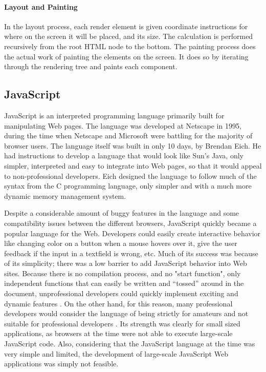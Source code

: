 \paragraph{Layout and Painting}
In the layout process, each render element is given coordinate instructions for where on the screen it will be placed, and its size. The calculation is performed recursively from the root HTML node to the bottom.
The painting process does the actual work of painting the elements on the screen. It does so by iterating through the rendering tree and paints each component.
 
\subsection{JavaScript}
JavaScript is an interpreted programming language primarily built for manipulating Web pages. The language was developed at Netscape in 1995, during the time when Netscape and Microsoft were battling for the majority of browser users. The language itself was built in only 10 days, by Brendan Eich\cite{jsin10days}. He had instructions to develop a language that would look like Sun's Java, only simpler, interpreted and easy to integrate into Web pages, so that it would appeal to non-professional developers. Eich designed the language to follow much of the syntax from the C programming language, only simpler and with a much more dynamic memory management system. 

Despite a considerable amount of buggy features in the language and some compatibility issues between the different browsers, JavaScript quickly became a  popular language for the Web. Developers could easily create interactive behavior like changing color on a button when a mouse hovers over it, give the user feedback if the input in a textfield is wrong, etc. Much of its success was because of its simplicity; there was a low barrier to add JavaScript behavior into Web sites. Because there is no compilation process, and no "start function", only independent functions that can easily be written and ``tossed'' around in the document, unprofessional developers could quickly implement exciting and dynamic features \cite{jsHowGotHere}. On the other hand, for this reason, many professional developers would consider the language of being strictly for amateurs and not suitable for professional developers \cite{UnderstoodJs}.  Its strength was clearly for small sized applications, as browsers at the time were not able to execute large-scale JavaScript code. Also, considering that the JavaScript language at the time was very simple and limited, the development of large-scale JavaScript Web applications was simply not feasible. 
 
